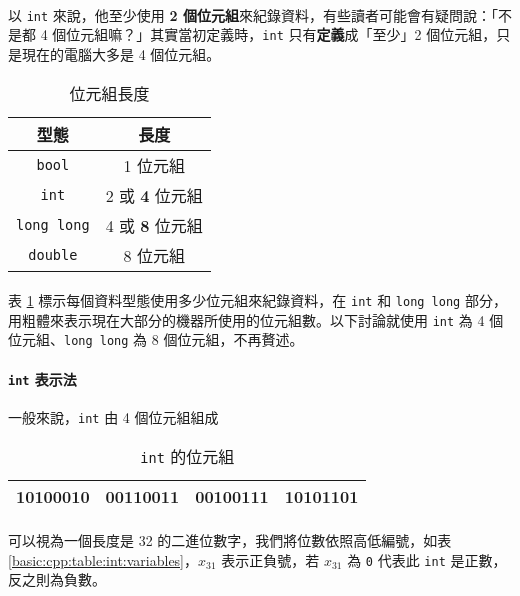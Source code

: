 \documentclass[12pt,a4paper,oneside]{report}
\begin{document}
\begin{CJK}{UTF8}{bkai}
\paragraph{}以 \lstinline!int! 來說，他至少使用 \textbf{2 個位元組}來紀錄資料，有些讀者可能會有疑問說：「不是都 4 個位元組嘛？」其實當初定義時，\lstinline!int! 只有\textbf{定義}成「至少」2 個位元組，只是現在的電腦大多是 4 個位元組。

\begin{table}[h!]
\centering
\begin{tabular}{|c|c|}
\hline
型態 & 長度\\
\hline
\hline
\lstinline!bool!      & 1 位元組\\
\hline
\lstinline!int!       & 2 或 \textbf{4} 位元組\\
\hline
\lstinline!long long! & 4 或 \textbf{8} 位元組\\
\hline
\lstinline!double!    & 8 位元組\\
\hline
\end{tabular}
\caption{位元組長度}
\label{basic:cpp:table:byte:length}
\end{table}

\paragraph{}表 \ref{basic:cpp:table:byte:length} 標示每個資料型態使用多少位元組來紀錄資料，在 \lstinline!int! 和 \lstinline!long long! 部分，用粗體來表示現在大部分的機器所使用的位元組數。以下討論就使用 \lstinline!int! 為 4 個位元組、\lstinline!long long! 為 8 個位元組，不再贅述。

\paragraph{\lstinline!int! 表示法}一般來說，\lstinline!int! 由 4 個位元組組成

\begin{table}[h!]
\centering
\begin{tabular}{|c|c|c|c|}
\hline
10100010 & 00110011 & 00100111 & 10101101\\
\hline
\end{tabular}
\caption{\lstinline!int! 的位元組}
\label{basic:cpp:table:int}
\end{table}

\paragraph{}可以視為一個長度是 32 的二進位數字，我們將位數依照高低編號，如表 \ref{basic:cpp:table:int:variables}，$x_{31}$ 表示正負號，若 $x_{31}$ 為 \lstinline!0! 代表此 \lstinline!int! 是正數，反之則為負數。


\end{CJK}
\end{document}
